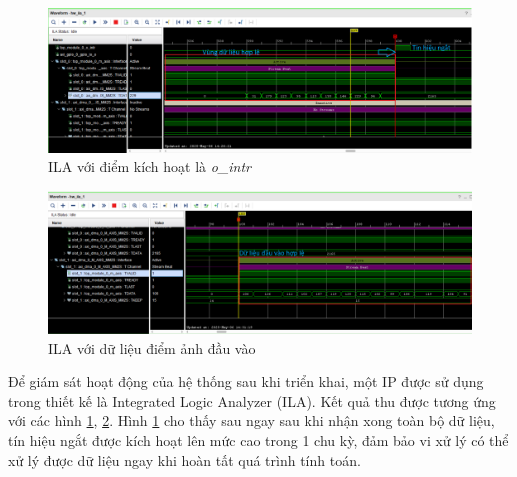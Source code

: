 \begin{figure}[H]
	\centering
	\includegraphics[width=\linewidth]{figures/ila1.png}
	\caption{ILA với điểm kích hoạt là \textit{o\_intr}}
	\label{fig:ila1}
\end{figure}
\begin{figure}[H]
	\centering
	\includegraphics[width=\linewidth]{figures/ila3.png}
	\caption{ILA với dữ liệu điểm ảnh đầu vào}
	\label{fig:ila3}
\end{figure}


Để giám sát hoạt động của hệ thống sau khi triển khai, một IP được sử dụng trong thiết kế là Integrated Logic Analyzer (ILA). Kết quả thu được tương ứng với các hình \ref{fig:ila1}, \ref{fig:ila3}. Hình \ref{fig:ila1} cho thấy sau ngay sau khi nhận xong toàn bộ dữ liệu, tín hiệu ngắt được kích hoạt lên mức cao trong 1 chu kỳ, đảm bảo vi xử lý có thể xử lý được dữ liệu ngay khi hoàn tất quá trình tính toán.
